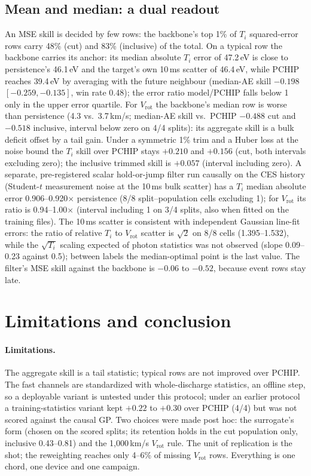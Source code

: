 \documentclass[10pt,twocolumn,letterpaper]{article}
\newcommand{\Ti}{\ensuremath{T_i}}
\newcommand{\Vrot}{\ensuremath{V_\mathrm{rot}}}
\begin{document}
\subsection{Mean and median: a dual readout}
\label{sec:res:dual}
An MSE skill is decided by few rows: the backbone's top 1\% of \Ti{} squared-error
rows carry 48\% (cut) and 83\% (inclusive) of the total. On a typical row the backbone
carries its anchor: its median absolute \Ti{} error of 47.2\,eV is close to persistence's
46.1\,eV and the target's own 10\,ms scatter of 46.4\,eV, while PCHIP reaches 39.4\,eV
by averaging with the future neighbour (median-AE skill $-0.198$
$[-0.259, -0.135]$, win rate 0.48); the error ratio model/PCHIP falls below 1 only in
the upper error quartile. For \Vrot{} the backbone's median row is worse than
persistence (4.3 vs.\ 3.7\,km/s; median-AE skill vs.\ PCHIP $-0.488$ cut and $-0.518$
inclusive, interval below zero on 4/4 splits): its aggregate skill is a bulk deficit
offset by a tail gain. Under a symmetric 1\% trim and a Huber loss at the noise bound
the \Ti{} skill over PCHIP stays $+0.210$ and $+0.156$ (cut, both intervals excluding
zero); the inclusive trimmed skill is $+0.057$ (interval including zero). A separate,
pre-registered scalar hold-or-jump filter run causally on the CES history (Student-$t$
measurement noise at the 10\,ms bulk scatter) has a \Ti{} median absolute error
0.906--0.920$\times$ persistence (8/8 split--population cells excluding 1); for \Vrot{}
its ratio is 0.94--1.00$\times$ (interval including 1 on 3/4 splits, also when fitted
on the training files). The 10\,ms scatter is
consistent with independent Gaussian line-fit errors: the ratio of relative \Ti{} to
\Vrot{} scatter is $\sqrt2$ on 8/8 cells (1.395--1.532), while the $\sqrt{T_i}$ scaling
expected of photon statistics was not observed (slope 0.09--0.23 against 0.5); between
labels the median-optimal point is the last value. The filter's MSE skill against the
backbone is $-0.06$ to $-0.52$, because event rows stay late.

\section{Limitations and conclusion}
\label{sec:conclusion}

\paragraph{Limitations.} The aggregate skill is a tail statistic; typical rows are not
improved over PCHIP. The fast channels are standardized with whole-discharge
statistics, an offline step, so a deployable variant is untested under this protocol;
under an earlier protocol a training-statistics variant kept $+0.22$ to $+0.30$ over
PCHIP (4/4) but was not scored against the causal GP. Two choices were made post hoc:
the surrogate's form (chosen on the scored splits; its retention holds in the cut
population only, inclusive 0.43--0.81) and the 1{,}000\,km/s \Vrot{} rule. The unit of
replication is the shot; the reweighting reaches only 4--6\% of missing \Vrot{} rows.
Everything is one chord, one device and one campaign.
\end{document}
